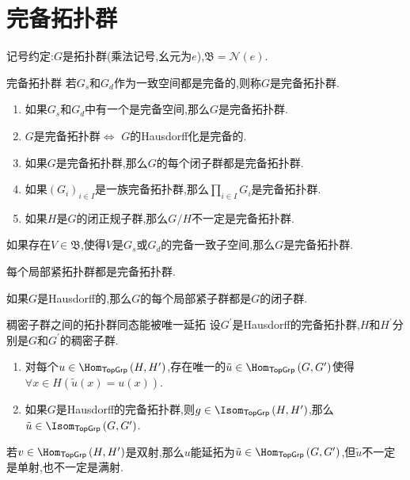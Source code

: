 \section{完备拓扑群}

记号约定:$G$是拓扑群(乘法记号,幺元为$e$),$\mathfrak{B}=\mathcal{N}\left(e\right)$.

\begin{definition}{完备拓扑群}{}
	若$G_{s}$和$G_{d}$作为一致空间都是完备的,则称$G$是完备拓扑群.
\end{definition}

\begin{remark}{}{}
	\begin{enumerate}
		\item 如果$G_{s}$和$G_{d}$中有一个是完备空间,那么$G$是完备拓扑群.
		\item $G$是完备拓扑群$\iff$ $G$的Hausdorff化是完备的.
		\item 如果$G$是完备拓扑群,那么$G$的每个闭子群都是完备拓扑群.
		\item 如果$\left(G_{i}\right)_{i\in I}$是一族完备拓扑群,那么$\prod\limits_{i\in I}G_{i}$是完备拓扑群.
		\item 如果$H$是$G$的闭正规子群,那么$G/H$不一定是完备拓扑群.
	\end{enumerate}
\end{remark}

\begin{proposition}{}{}
	如果存在$V\in\mathfrak{B}$,使得$V$是$G_{s}$或$G_{d}$的完备一致子空间,那么$G$是完备拓扑群.
\end{proposition}

\begin{corollary}{}{}
	每个局部紧拓扑群都是完备拓扑群.
\end{corollary}

\begin{corollary}{}{}
	如果$G$是Hausdorff的,那么$G$的每个局部紧子群都是$G$的闭子群.
\end{corollary}

\begin{proposition}{稠密子群之间的拓扑群同态能被唯一延拓}{}
	设$G^{\prime}$是Hausdorff的完备拓扑群,$H$和$H^{\prime}$分别是$G$和$G^{\prime}$的稠密子群.
	\begin{enumerate}
		\item 对每个$u\in\Hom_{\mathsf{TopGrp}}\left(H,H^{\prime}\right)$,存在唯一的$\tilde{u}\in\Hom_{\mathsf{TopGrp}}\left(G,G^{\prime}\right)$使得$\forall x\in H\left(\tilde{u}\left(x\right)=u\left(x\right)\right)$.
		\item 如果$G$是Hausdorff的完备拓扑群,则$g\in\Isom_{\mathsf{TopGrp}}\left(H,H^{\prime}\right)$,那么$\tilde{u}\in\Isom_{\mathsf{TopGrp}}\left(G,G^{\prime}\right)$.
	\end{enumerate}
\end{proposition}

\begin{remark}{}{}
	若$v\in\Hom_{\mathsf{TopGrp}}\left(H,H^{\prime}\right)$是双射,那么$u$能延拓为$\tilde{u}\in\Hom_{\mathsf{TopGrp}}\left(G,G^{\prime}\right)$,但$\tilde{u}$不一定是单射,也不一定是满射.
\end{remark}


